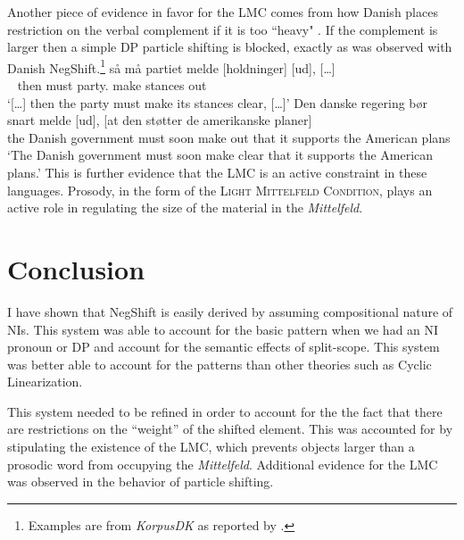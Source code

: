 \documentclass[12pt, letterpaper]{article}
\begin{document}
Another piece of evidence in favor for the LMC comes from how Danish places restriction on the verbal complement if it is too ``heavy" \citep[44f]{mullerDanishHeadDrivenPhraseInpreparation}. If the complement is larger then a simple DP particle shifting is blocked, exactly as was observed with Danish NegShift.\footnote{Examples are from \emph{KorpusDK} as reported by \citet{mullerDanishHeadDrivenPhraseInpreparation}.} 
	\ea \gll {[…]} så må partiet melde [holdninger] [ud], {[…]}\\
	~ then must party.\Def{} make stances out\\
	\glt `{[…]} then the party must make its stances clear, {[…]}'
	\ex \gll Den danske regering bør snart melde [ud], [at den støtter de amerikanske planer]\\
	the Danish government must soon make out that it supports the American plans\\
	\glt `The Danish government must soon make clear that it supports the American plans.'
	\z 
This is further evidence that the LMC is an active constraint in these languages. Prosody, in the form of the \textsc{Light Mittelfeld Condition}, plays an active role in regulating the size of the material in the \emph{Mittelfeld}.

\section{Conclusion} \label{sec:CONCLUSION}

I have shown that NegShift is easily derived by assuming  compositional nature of NIs. This system was able to account for the basic pattern when we had an NI pronoun or DP and account for the semantic effects of split-scope. This system was better able to account for the patterns than other theories such as Cyclic Linearization. 

This system needed to be refined in order to account for the the fact that there are restrictions on the ``weight'' of the shifted element. This was accounted for by stipulating the existence of the LMC, which prevents objects larger than a prosodic word from occupying the \emph{Mittelfeld}. Additional evidence for the LMC was observed in the behavior of particle shifting. 


\printbibliography[heading=bibintoc]
\end{document}
